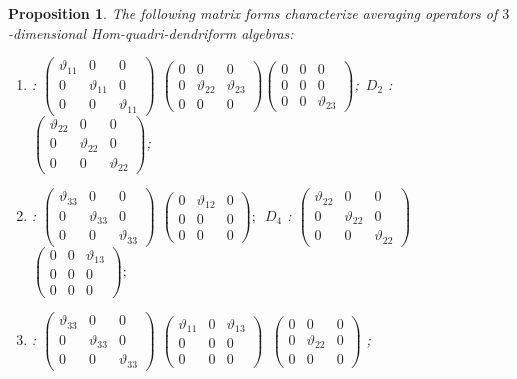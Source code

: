 \documentclass[11pt,twoside,reqno]{amsart}
\theoremstyle{plain}
\newtheorem{proposition}[thm]{Proposition}
\theoremstyle{definition}
\begin{document}
\begin{proposition}
The following matrix forms characterize  averaging operators of $3$-dimensional  Hom-quadri-dendriform algebras:
\begin{enumerate}
	\item[$D_1$] : 
$\left(\begin{array}{ccc}
\vartheta_{11}&0&0\\
0&\vartheta_{11}&0\\
0&0&\vartheta_{11}
\end{array}
\right)$
$\left(\begin{array}{ccc}
0&0&0\\
0&\vartheta_{22}&\vartheta_{23}\\
0&0&0
\end{array}
\right) 
\left(\begin{array}{ccc}
0&0&0\\
0&0&0\\
0&0&\vartheta_{23}
\end{array}
\right)$;\ 
$D_2$ : 
$\left(\begin{array}{ccc}
\vartheta_{22}&0&0\\
0&\vartheta_{22}&0\\
0&0&\vartheta_{22}
\end{array}
\right)$;
\item[$D_3$] : 
$\left(\begin{array}{ccc}
\vartheta_{33}&0&0\\
0&\vartheta_{33}&0\\
0&0&\vartheta_{33}
\end{array}
\right)$ 
$\left(\begin{array}{ccc}
0&\vartheta_{12}&0\\
0&0&0\\
0&0&0
\end{array}
\right);$\ 
$D_4$ : 
$\left(\begin{array}{ccc}
\vartheta_{22}&0&0\\
0&\vartheta_{22}&0\\
0&0&\vartheta_{22}
\end{array}
\right)$
$\left(\begin{array}{ccc}
0&0&\vartheta_{13}\\
0&0&0\\
0&0&0
\end{array}
\right)
;
$
\item[$D_5$] : 
$\left(\begin{array}{ccc}
\vartheta_{33}&0&0\\
0&\vartheta_{33}&0\\
0&0&\vartheta_{33}
\end{array}
\right)$
$\left(\begin{array}{ccc}
\vartheta_{11}&0&\vartheta_{13}\\
0&0&0\\
0&0&0
\end{array}
\right) $\ 
$\left(\begin{array}{ccc}
0&0&0\\
0&\vartheta_{22}&0\\
0&0&0
\end{array}
\right)$
;


\end{enumerate}
\end{proposition}
\end{document}

